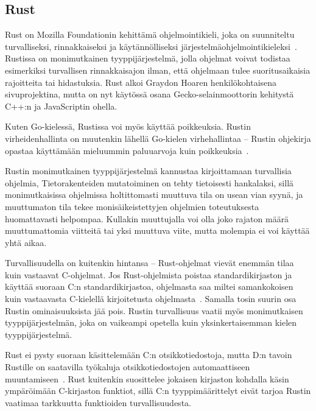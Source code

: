 \subsection{Rust}

Rust on Mozilla Foundationin kehittämä ohjelmointikieli, joka on suunniteltu
turvalliseksi, rinnakkaiseksi ja käytännölliseksi
järjestelmäohjelmointikieleksi~\citep{rustfaq}. Rustissa on monimutkainen
tyyppijärjestelmä, jolla ohjelmat voivat todistaa esimerkiksi turvallisen
rinnakkaisajon ilman, että ohjelmaan tulee suoritusaikaisia rajoitteita tai
hidastuksia. Rust alkoi Graydon Hoaren henkilökohtaisena sivuprojektina, mutta
on nyt käytössä osana Gecko-selainmoottorin kehitystä C++:n ja JavaScriptin
ohella.

Kuten Go-kielessä, Rustissa voi myös käyttää poikkeuksia. Rustin
virheidenhallinta on muutenkin lähellä Go-kielen virhehallintaa -- Rustin
ohjekirja opastaa käyttämään mieluummin paluuarvoja kuin
poikkeuksia~\citep{rusterrorhandling}.

Rustin monimutkainen tyyppijärjestelmä kannustaa kirjoittamaan turvallisia
ohjelmia, Tietorakenteiden mutatoiminen on tehty tietoisesti hankalaksi, sillä
monimutkaisissa ohjelmissa holtittomasti muuttuva tila on usean vian syynä, ja
muuttumaton tila tekee monisäikeistettyjen ohjelmien
toteutuksesta huomattavasti helpompaa\citationneeded. Kullakin muuttujalla voi
olla joko rajaton määrä muuttumattomia viitteitä
tai yksi muuttuva viite, mutta molempia ei voi
käyttää yhtä aikaa.

Turvallisuudella on kuitenkin hintansa -- Rust-ohjelmat vievät enemmän tilaa
kuin vastaavat C-ohjelmat. Jos Rust-ohjelmista poistaa standardikirjaston ja
käyttää suoraan C:n standardikirjastoa, ohjelmasta saa miltei samankokoisen
kuin vastaavasta C-kielellä kirjoitetusta ohjelmasta~\citep{rustbinarysize}.
Samalla tosin suurin osa Rustin ominaisuuksista jää pois. Rustin turvallisuus
vaatii myös monimutkaisen tyyppijärjestelmän, joka on vaikeampi opetella kuin
yksinkertaisemman kielen tyyppijärjestelmä.

Rust ei pysty suoraan käsittelemään C:n otsikkotiedostoja, mutta D:n tavoin
Rustille on saatavilla työkaluja otsikkotiedostojen automaattiseen
muuntamiseen~\citep{rustbindgen}. Rust kuitenkin suosittelee jokaisen kirjaston
kohdalla käsin ympäröimään C-kirjaston funktiot, sillä C:n tyyppimäärittelyt
eivät tarjoa Rustin vaatimaa tarkkuutta funktioiden turvallisuudesta.

